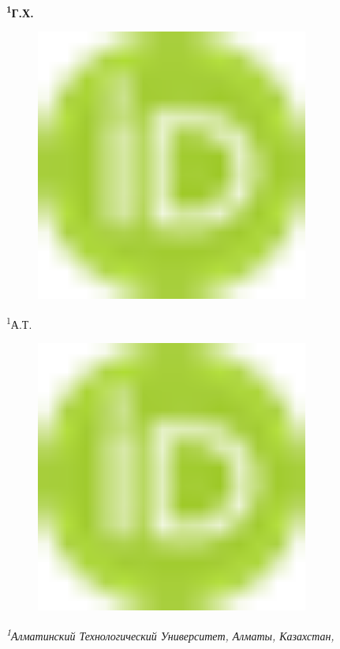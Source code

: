 {{{\bfseries \textsuperscript{1}Г.Х.
\begin{figure}[H]
	\centering
	\includegraphics[width=0.8\textwidth]{media/pish3/image1}
	\caption*{}
\end{figure}

\textsuperscript{1}А.Т.
\begin{figure}[H]
	\centering
	\includegraphics[width=0.8\textwidth]{media/pish3/image1}
	\caption*{}
\end{figure}


\emph{\textsuperscript{1}Алматинский Технологический Университет,
Алматы, Казахстан,}

}}}
